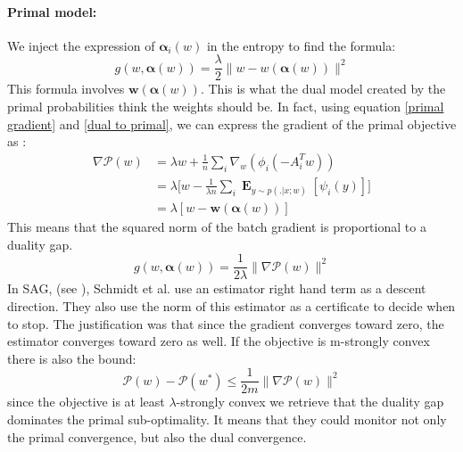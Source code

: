 \documentclass{article}
\DeclareMathOperator{\1}{\mathbb{1}}
\DeclareMathOperator{\E}{\mathbf{E}}
\begin{document}
\paragraph{Primal model:}
We inject the expression of $\bm \alpha_i(w)$ in the entropy to find the formula:
\begin{equation}
	\label{primal duality gap}
	g(w,\bm \alpha(w)) = \frac{\lambda}{2} \|w-w(\bm \alpha(w))\|^2
\end{equation}
This formula involves $\bm w(\bm \alpha(w))$.
This is what the dual model created by the primal probabilities think the weights should be. 
In fact, using equation \ref{primal gradient} and \ref{dual to primal}, we can express the gradient of the primal objective 	as :
\begin{align*}
	\nabla \mathscr P(w) 
	& = \lambda w + \frac{1}{n} \sum_i \nabla_w(\phi_i(-A_i^Tw)) \\
	& = \lambda \bigg [ w - \frac{1}{\lambda n} \sum_i \E_{y \sim p(. | x ; w)} [\psi_i(y)] \bigg ] \\
	& = \lambda [ w - \bm w(\bm \alpha(w))]
\end{align*}
This means that the squared norm of the batch gradient is proportional to a duality gap.
\begin{equation}
	g(w,\bm \alpha(w)) = \frac{1}{2 \lambda} \|\nabla \mathscr P(w)\|^2
\end{equation}
In SAG, (see \cite{schmidt_non-uniform_2015}), Schmidt et al. use an estimator right hand term as a descent direction.
They also use the norm of this estimator as a certificate to decide when to stop.
The justification was that since the gradient converges toward zero, the estimator converges toward zero as well.
If the objective is m-strongly convex there is also the bound:
\begin{equation*}
	\mathscr P (w) - \mathscr P(w^*) \leq \frac{1}{2 m}\|\nabla \mathscr P (w)\|^2
\end{equation*}
since the objective is at least $\lambda$-strongly convex we retrieve that the duality gap dominates the primal sub-optimality.
It means that they could monitor not only the primal convergence, but also the dual convergence.
\end{document}

